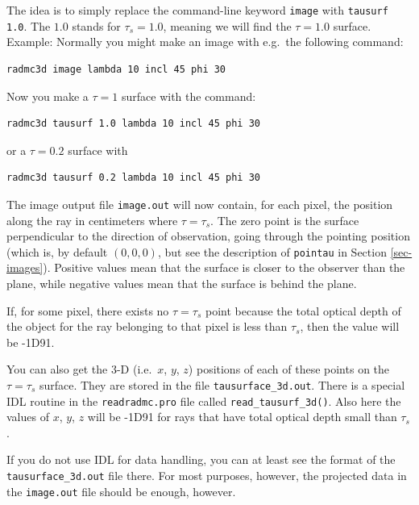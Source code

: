 \documentclass{report}
\newenvironment{asciibox}%
  {\begin{list}{}{%
    \setlength{\topsep}{0.5em}%
    \setlength{\parskip}{0em}%
    \setlength{\parsep}{0em}%
    \setlength{\itemsep}{0em}%
    \setlength{\rightmargin}{0em}%
    \setlength{\leftmargin}{3.0em}%
    \setlength{\labelsep}{1em}%
    \setlength{\labelwidth}{2em}%
  }\normalfont\footnotesize\item}
  {\end{list}}
\begin{document}
The idea is to simply replace the command-line keyword {\small\tt image}
with  {\small\tt tausurf 1.0}. The $1.0$ stands for $\tau_s=1.0$, meaning
we will find the $\tau=1.0$ surface. Example: Normally you might make an
image with e.g.\ the following command:
\begin{asciibox}\begin{verbatim}
radmc3d image lambda 10 incl 45 phi 30
\end{verbatim}\end{asciibox}
Now you make a $\tau=1$ surface with the command:
\begin{asciibox}\begin{verbatim}
radmc3d tausurf 1.0 lambda 10 incl 45 phi 30
\end{verbatim}\end{asciibox}
or a $\tau=0.2$ surface with
\begin{asciibox}\begin{verbatim}
radmc3d tausurf 0.2 lambda 10 incl 45 phi 30
\end{verbatim}\end{asciibox}

The image output file {\small\tt image.out} will now contain, for each
pixel, the position along the ray in centimeters where $\tau=\tau_s$. The
zero point is the surface perpendicular to the direction of observation,
going through the pointing position (which is, by default $(0,0,0)$, but see
the description of {\small\tt pointau} in Section
\ref{sec-images}). Positive values mean that the surface is closer to the
observer than the plane, while negative values mean that the surface is
behind the plane.

If, for some pixel, there exists no $\tau=\tau_s$ point because the total
optical depth of the object for the ray belonging to that pixel is less
than $\tau_s$, then the value will be -1D91. 

You can also get the 3-D (i.e.~$x$, $y$, $z$) positions of each of these
points on the $\tau=\tau_s$ surface. They are stored in the file
{\small\tt tausurface\_3d.out}. There is a special IDL routine in the
{\small\tt readradmc.pro} file called {\small\tt read\_tausurf\_3d()}.
Also here the values of $x$, $y$, $z$ will be -1D91 for rays that
have total optical depth small than $\tau_s$.

If you do not use IDL for data handling, you can at least see the format
of the {\small\tt tausurface\_3d.out} file there. For most purposes, 
however, the projected data in the {\small\tt image.out} file should
be enough, however.
\end{document}
